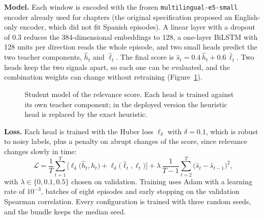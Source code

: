 \textbf{Model.} Each window is encoded with the frozen \texttt{multilingual-e5-small} encoder already used for chapters (the original specification proposed an English-only encoder, which did not fit Spanish episodes). A linear layer with a dropout of 0.3 reduces the 384-dimensional embeddings to 128, a one-layer BiLSTM with 128 units per direction reads the whole episode, and two small heads predict the two teacher components, $\hat h_t$ and $\hat \ell_t$. The final score is $\hat s_t = 0.4\,\hat h_t + 0.6\,\hat\ell_t$. Two heads keep the two signals apart, so each one can be evaluated, and the combination weights can change without retraining (Figure~\ref{fig:relevance-student}).

\begin{figure}[H]
\centering
{}
\caption{Student model of the relevance score. Each head is trained against its own teacher component; in the deployed version the heuristic head is replaced by the exact heuristic.}
\label{fig:relevance-student}
\end{figure}

\textbf{Loss.} Each head is trained with the Huber loss $\ell_\delta$ \cite{huber1964robust} with $\delta = 0.1$, which is robust to noisy labels, plus a penalty on abrupt changes of the score, since relevance changes slowly in time:
\begin{equation}
\mathcal{L} = \frac{1}{T}\sum_{t=1}^{T}\Big[\ell_\delta\big(\hat h_t, h_t\big) + \ell_\delta\big(\hat\ell_t, \ell_t\big)\Big] + \lambda\,\frac{1}{T-1}\sum_{t=2}^{T}\big(\hat s_t - \hat s_{t-1}\big)^2 ,
\label{eq:relevance}
\end{equation}
with $\lambda \in \{0, 0.1, 0.5\}$ chosen on validation. Training uses Adam with a learning rate of $10^{-3}$, batches of eight episodes and early stopping on the validation Spearman correlation. Every configuration is trained with three random seeds, and the bundle keeps the median seed.

